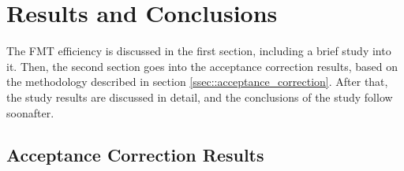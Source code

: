 \section{Results and Conclusions} \label{sec::resultsandconclusions}
    The FMT efficiency is discussed in the first section, including a brief study into it.
    Then, the second section goes into the acceptance correction results, based on the methodology described in section \ref{ssec::acceptance_correction}.
    After that, the study results are discussed in detail, and the conclusions of the study follow soonafter.

    

\subsection{Acceptance Correction Results}


